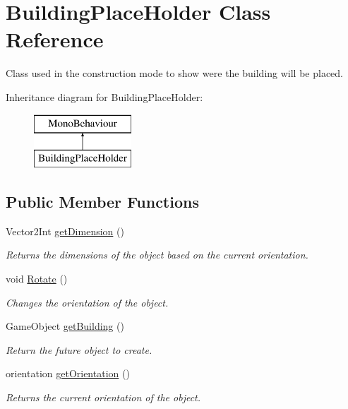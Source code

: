 \hypertarget{class_building_place_holder}{}\section{Building\+Place\+Holder Class Reference}
\label{class_building_place_holder}


Class used in the construction mode to show were the building will be placed.  


Inheritance diagram for Building\+Place\+Holder\+:\begin{figure}[H]
\begin{center}
\leavevmode
\includegraphics[height=2.000000cm]{class_building_place_holder}
\end{center}
\end{figure}
\subsection*{Public Member Functions}
\begin{DoxyCompactItemize}
\item 
Vector2\+Int \mbox{\hyperlink{class_building_place_holder_a91b51db36b78906565aeb2dd32b5db82}{get\+Dimension}} ()
\begin{DoxyCompactList}\small\item\em Returns the dimensions of the object based on the current orientation. \end{DoxyCompactList}\item 
void \mbox{\hyperlink{class_building_place_holder_a693222f4af7c27b6687e3c544b4d60f0}{Rotate}} ()
\begin{DoxyCompactList}\small\item\em Changes the orientation of the object. \end{DoxyCompactList}\item 
Game\+Object \mbox{\hyperlink{class_building_place_holder_a13c29939a115084aa9c93662933cc890}{get\+Building}} ()
\begin{DoxyCompactList}\small\item\em Return the future object to create. \end{DoxyCompactList}\item 
orientation \mbox{\hyperlink{class_building_place_holder_a2d54012f5c6a7271bd804bdb8f554312}{get\+Orientation}} ()
\begin{DoxyCompactList}\small\item\em Returns the current orientation of the object. \end{DoxyCompactList}\end{DoxyCompactItemize}


